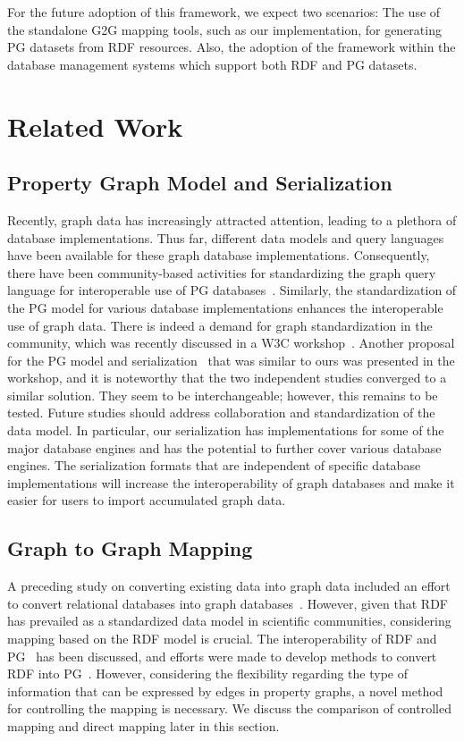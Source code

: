 \documentclass[runningheads]{llncs}
\begin{document}
For the future adoption of this framework, we expect two scenarios: The use of the standalone G2G mapping tools, such as our implementation, for generating PG datasets from RDF resources. Also, the adoption of the framework within the database management systems which support both RDF and PG datasets.

\section{Related Work}

\subsection{Property Graph Model and Serialization}
Recently, graph data has increasingly attracted attention, leading to a plethora of database implementations. 
Thus far, different data models and query languages have been available for these graph database implementations.
Consequently, there have been community-based activities for standardizing the graph query language for interoperable use of PG databases~\cite{angles3}. Similarly, the standardization of the PG model for various database implementations enhances the interoperable use of graph data. There is indeed a demand for graph standardization in the community, which was recently discussed in a W3C workshop~\cite{w3c}. Another proposal for the PG model and serialization~\cite{tomaszuk} that was similar to ours was presented in the workshop, and it is noteworthy that the two independent studies converged to a similar solution. They seem to be interchangeable; however, this remains to be tested. Future studies should address collaboration and standardization of the data model.
In particular, our serialization has implementations for some of the major database engines and has the potential to further cover various database engines. 
The serialization formats that are independent of specific database implementations will increase the interoperability of graph databases and make it easier for users to import accumulated graph data.

\subsection{Graph to Graph Mapping}
A preceding study on converting existing data into graph data included an effort to convert relational databases into graph databases~\cite{virgilio1}. 
However, given that RDF has prevailed as a standardized data model in scientific communities, considering mapping based on the RDF model is crucial. The interoperability of RDF and PG~\cite{hartig,angles4,das,thakkar} has been discussed, and efforts were made to develop methods to convert RDF into PG~\cite{tomaszuk1,virgilio}. However, considering the flexibility regarding the type of information that can be expressed by edges in property graphs, a novel method for controlling the mapping is necessary.
We discuss the comparison of controlled mapping and direct mapping later in this section.
\end{document}
